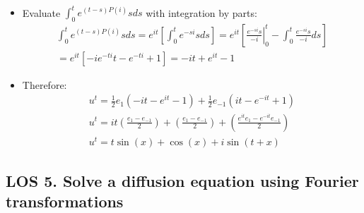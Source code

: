 \documentclass[12pt, a4paper]{article}
\begin{document}
\begin{itemize}
\begin{gather*}
    \end{gather*}
    \item Evaluate $\int_0^t e^{(t-s)P(i)}sds$ with integration by parts:
    \begin{gather*}
        \int_0^t e^{(t-s)P(i)}sds = e^{it}\left[\int_0^te^{-si}sds\right] = e^{it}\left[\left.\frac{e^{-si}s}{-i}\right\rvert^t_0 - \int_0^t\frac{e^{-si}s}{-i}ds\right]\\
        = e^{it}\left[-ie^{-ti}t - e^{-ti} + 1\right] = -it +e^{it} - 1
    \end{gather*}
    \item Therefore:
    \begin{gather*}
        u^t = \frac{1}{2}e_1(-it -e^{it} - 1) + \frac{1}{2}e_{-1}(it -e^{-it} + 1) \\
        u^t = it(\frac{e_1-e_{-1}}{2}) + (\frac{e_1-e_{-1}}{2}) + (\frac{e^{it}e_1 - e^{-it}e_{-1}}{2}) \\
        u^t = t\sin(x) + \cos(x) + i\sin(t+x)
    \end{gather*}
\end{itemize}
\vspace{0.3em}

\subsection*{LOS 5. Solve a diffusion equation using Fourier transformations}
\end{document}
